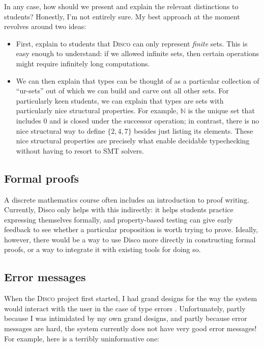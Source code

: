 \documentclass[copyright,creativecommons,11pt]{eptcs}
\newcommand{\disco}{\textsc{Disco}\xspace}
\newcommand{\N}{\mathbb{N}}
\begin{document}
In any case, how should we present and explain the relevant
distinctions to students?  Honestly, I'm not entirely sure.  My best
approach at the moment revolves around two ideas:
\begin{itemize}
\item First, explain to students that \disco can only represent
  \emph{finite} sets.  This is easy enough to understand: if we
  allowed infinite sets, then certain operations might require
  infinitely long computations.
\item We can then explain that types can be thought of as a particular
  collection of ``ur-sets'' out of which we can build and carve out
  all other sets.  For particularly keen students, we can explain that
  types are sets with particularly nice structural properties.  For
  example, $\N$ is the unique set that includes $0$ and is closed
  under the successor operation; in contrast, there is no nice
  structural way to define $\{2,4,7\}$ besides just listing its
  elements.  These nice structural properties are precisely what
  enable decidable typechecking without having to resort to SMT
  solvers.
\end{itemize}

\subsection{Formal proofs}
\label{sec:formal-proof}

A discrete mathematics course often includes an introduction to proof
writing.  Currently, Disco only helps with this indirectly: it helps
students practice expressing themselves formally, and property-based
testing can give early feedback to see whether a particular
proposition is worth trying to prove.  Ideally, however, there would
be a way to use Disco more directly in constructing formal proofs, or
a way to integrate it with existing tools for doing so.

\subsection{Error messages}
\label{sec:errors}

When the \disco project first started, I had grand designs for the way
the system would interact with the user in the case of type errors
\cite{yorgey2018explaining}. Unfortunately, partly because I was
intimidated by my own grand designs, and partly because error messages
are hard, the system currently does not have very good error messages!
For example, here is a terribly uninformative one:
\end{document}
